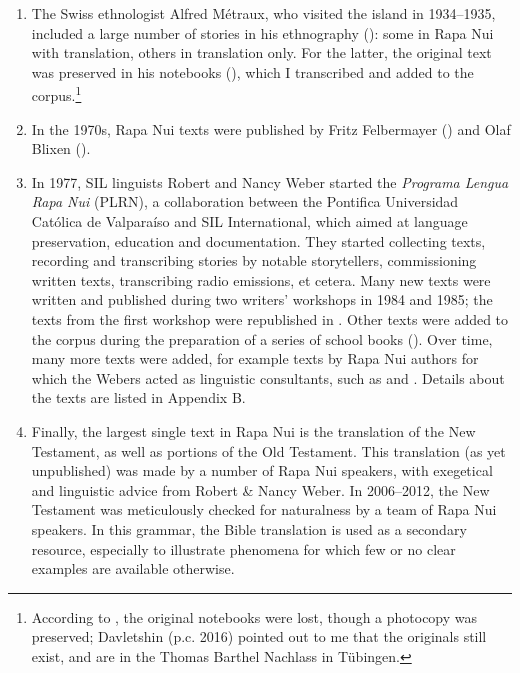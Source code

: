 \begin{enumerate}
\item 
The Swiss ethnologist Alfred Métraux, who visited the island in 1934–1935, included a large number of stories in his ethnography (\citealt{Métraux1971}): some in Rapa Nui with translation, others in translation only. For the latter, the original text was preserved in his notebooks (\citealt{Métraux1935}), which I transcribed and added to the corpus.\footnote{\label{fn:29}According to \citet{Fischer2008Correspondence,Fischer2009}, the original notebooks were lost, though a photocopy was preserved; Davletshin (p.c. 2016) pointed out to me that the originals still exist, and are in the Thomas Barthel Nachlass in Tübingen.} 

\item 
In the 1970s, Rapa Nui texts were published by Fritz Felbermayer (\citealt{Felbermayer1971,Felbermayer1973,Felbermayer1978}) and Olaf Blixen (\citealt{Blixen1973,Blixen1974}). 

\item 
In 1977, SIL linguists Robert and Nancy Weber started the \textit{Programa Lengua Rapa Nui} (PLRN), a collaboration between the Pontifica Universidad Católica de Valparaíso and SIL International, which aimed at language preservation, education and documentation. They started collecting texts, recording and transcribing stories by notable storytellers, commissioning written texts, transcribing radio emissions, et cetera. Many new texts were written and published during two writers’ workshops in 1984 and 1985; the texts from the first workshop were republished in \citet{PatéTukiTukiTepano1986}. Other texts were added to the corpus during the preparation of a series of school books (\citealt{WeberWeber1990Mai,WeberWeber1990Mo}). Over time, many more texts were added, for example texts by Rapa Nui authors for which the Webers acted as linguistic consultants, such as \citet{CuadrosHucke2008} and \citet{PakaratiTuki2010}. Details about the texts are listed in Appendix B.

\item 
Finally, the largest single text in Rapa Nui is the translation of the New Testament, as well as portions of the Old Testament. This translation (as yet unpublished) was made by a number of Rapa Nui speakers, with exegetical and linguistic advice from Robert \& Nancy Weber. In 2006–2012, the New Testament was meticulously checked for naturalness by a team of Rapa Nui speakers. In this grammar, the Bible translation is used as a secondary resource, especially to illustrate phenomena for which few or no clear examples are available otherwise.

\end{enumerate}

